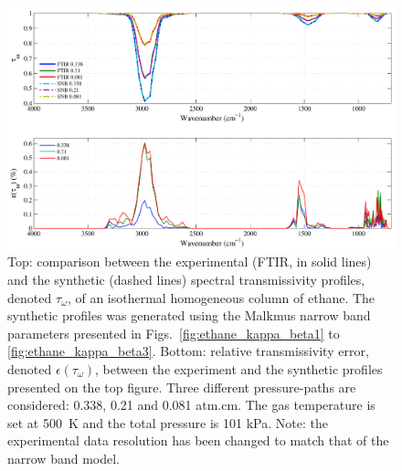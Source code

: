 \begin{figure}[p]
\includegraphics[width=\textwidth]{Figures/Comparison_Fit_Ethane_MALKMUS_Temp500K.pdf}
\caption{Top: comparison between the experimental (FTIR, in solid lines) and the synthetic (dashed lines) spectral transmissivity profiles, denoted $\tau_{\omega}$, of an isothermal homogeneous column of ethane. The synthetic profiles was generated using the Malkmus narrow band parameters presented in Figs.~\ref{fig:ethane_kappa_beta1} to \ref{fig:ethane_kappa_beta3}. Bottom: relative transmissivity error, denoted $\epsilon{(\tau_{\omega})}$, between the experiment and the synthetic profiles presented on the top figure. Three different pressure-paths are considered: 0.338, 0.21 and 0.081 atm.cm. The gas temperature is set at 500~K and the total pressure is 101 kPa. Note: the experimental data resolution has been changed to match that of the narrow band model. \label{fig:ethane_SNBVerify_500K}}
\end{figure}

